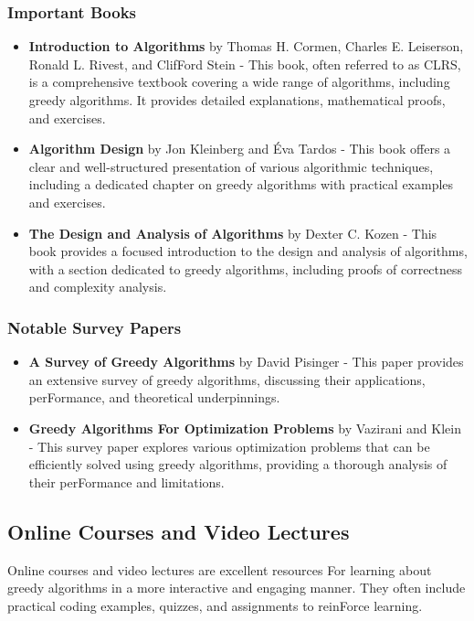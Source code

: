 \documentclass[12pt]{book} %
\begin{document}
\subsubsection*{Important Books}
\begin{itemize}
    \item \textbf{Introduction to Algorithms} by Thomas H. Cormen, Charles E. Leiserson, Ronald L. Rivest, and ClifFord Stein - This book, often referred to as CLRS, is a comprehensive textbook covering a wide range of algorithms, including greedy algorithms. It provides detailed explanations, mathematical proofs, and exercises.
    \item \textbf{Algorithm Design} by Jon Kleinberg and Éva Tardos - This book offers a clear and well-structured presentation of various algorithmic techniques, including a dedicated chapter on greedy algorithms with practical examples and exercises.
    \item \textbf{The Design and Analysis of Algorithms} by Dexter C. Kozen - This book provides a focused introduction to the design and analysis of algorithms, with a section dedicated to greedy algorithms, including proofs of correctness and complexity analysis.
\end{itemize}

\subsubsection*{Notable Survey Papers}
\begin{itemize}
    \item \textbf{A Survey of Greedy Algorithms} by David Pisinger - This paper provides an extensive survey of greedy algorithms, discussing their applications, perFormance, and theoretical underpinnings.
    \item \textbf{Greedy Algorithms For Optimization Problems} by Vazirani and Klein - This survey paper explores various optimization problems that can be efficiently solved using greedy algorithms, providing a thorough analysis of their perFormance and limitations.
\end{itemize}

\subsection{Online Courses and Video Lectures}
Online courses and video lectures are excellent resources For learning about greedy algorithms in a more interactive and engaging manner. They often include practical coding examples, quizzes, and assignments to reinForce learning.
\end{document}
